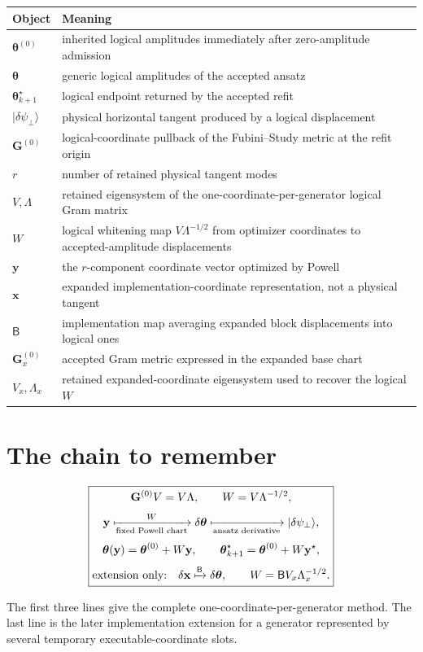 \documentclass[11pt]{article}
\newcommand{\ket}[1]{\lvert #1\rangle}
\begin{document}
\begin{center}
\renewcommand{\arraystretch}{1.2}
\begin{tabular}{@{}p{}p{}@{}}
\toprule
Object & Meaning \\
\midrule
\(\boldsymbol\theta^{(0)}\) &
inherited logical amplitudes immediately after zero-amplitude admission \\
\(\boldsymbol\theta\) &
generic logical amplitudes of the accepted ansatz \\
\(\boldsymbol\theta_{k+1}^\star\) &
logical endpoint returned by the accepted refit \\
\(\ket{\delta\psi_\perp}\) &
physical horizontal tangent produced by a logical displacement \\
\(\mathbf G^{(0)}\) &
logical-coordinate pullback of the Fubini--Study metric at the refit origin \\
\(r\) &
number of retained physical tangent modes \\
\(V,\Lambda\) &
retained eigensystem of the one-coordinate-per-generator logical Gram matrix \\
\(W\) &
logical whitening map \(V\Lambda^{-1/2}\) from optimizer coordinates to
accepted-amplitude displacements \\
\(\mathbf y\) &
the \(r\)-component coordinate vector optimized by Powell \\
\(\mathbf x\) &
expanded implementation-coordinate representation, not a physical tangent \\
\(\mathsf B\) &
implementation map averaging expanded block displacements into logical ones \\
\(\mathbf G_x^{(0)}\) &
accepted Gram metric expressed in the expanded base chart \\
\(V_x,\Lambda_x\) &
retained expanded-coordinate eigensystem used to recover the logical \(W\) \\
\bottomrule
\end{tabular}
\end{center}

\section*{The chain to remember}

\begin{equation}
\boxed{
\begin{gathered}
\mathbf G^{(0)}V=V\Lambda,\qquad
W=V\Lambda^{-1/2},\\[0.3em]
\mathbf y
\xmapsto[\text{fixed Powell chart}]{W}
\delta\boldsymbol\theta
\xmapsto[\text{ansatz derivative}]{}
\ket{\delta\psi_\perp},\\[0.3em]
\boldsymbol\theta(\mathbf y)
=
\boldsymbol\theta^{(0)}+W\mathbf y,
\qquad
\boldsymbol\theta_{k+1}^\star
=
\boldsymbol\theta^{(0)}+W\mathbf y^\star,\\[0.3em]
\text{extension only:}\quad
\delta\mathbf x\xmapsto{\mathsf B}\delta\boldsymbol\theta,\qquad
W=\mathsf B V_x\Lambda_x^{-1/2}.
\end{gathered}}
\label{eq:final-chain}
\end{equation}

\noindent
The first three lines give the complete one-coordinate-per-generator method.
The last line is the later implementation extension for a generator represented
by several temporary executable-coordinate slots.
\end{document}
